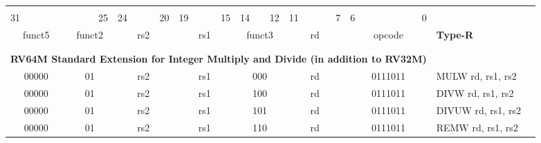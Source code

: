 \documentclass{report}
\begin{document}
\begin{table}[p]
\begin{small}
\begin{center}
\begin{tabular}{p{0.05mm}p{0.05mm}p{0.05mm}p{0.05mm}p{0.05mm}p{0.05mm}p{0.05mm}p{0.05mm}p{0.05mm}p{0.05mm}p{0.05mm}p{0.05mm}p{0.05mm}p{0.05mm}p{0.05mm}p{0.05mm}p{0.05mm}p{0.05mm}p{0.05mm}p{0.05mm}p{0.05mm}p{0.05mm}p{0.05mm}p{0.05mm}p{0.05mm}p{0.05mm}p{0.05mm}p{0.05mm}p{0.05mm}p{0.05mm}p{0.05mm}p{0.05mm}p{50mm}l}& & & & & & & & & & & & & & & & & & & & & & & & & & & & & & & & & \\
\multicolumn{3}{l}{\scriptsize{31}} & \multicolumn{4}{r}{\scriptsize{25}} & \multicolumn{2}{l}{\scriptsize{24}} & \multicolumn{3}{r}{\scriptsize{20}} & \multicolumn{2}{l}{\scriptsize{19}} & \multicolumn{3}{r}{\scriptsize{15}} & \multicolumn{1}{l}{\scriptsize{14}} & \multicolumn{2}{r}{\scriptsize{12}} & \multicolumn{2}{l}{\scriptsize{11}} & \multicolumn{3}{r}{\scriptsize{7}} & \multicolumn{3}{l}{\scriptsize{6}} & \multicolumn{4}{r}{\scriptsize{0}} &  \\
\cline{1-32}
\multicolumn{5}{|c|}{funct5} & \multicolumn{2}{c|}{funct2} & \multicolumn{5}{c|}{rs2} & \multicolumn{5}{c|}{rs1} & \multicolumn{3}{c|}{funct3} & \multicolumn{5}{c|}{rd} & \multicolumn{7}{c|}{opcode} & \scriptsize{\bf Type-R} \\
\cline{1-32}
\tabularnewline
\tabularnewline
\multicolumn{32}{c}{\bf RV64M Standard Extension for Integer Multiply and Divide (in addition to RV32M) } & \\
\cline{1-32}
\multicolumn{5}{|c|}{00000} & \multicolumn{2}{c|}{01} & \multicolumn{5}{c|}{rs2} & \multicolumn{5}{c|}{rs1} & \multicolumn{3}{c|}{000} & \multicolumn{5}{c|}{rd} & \multicolumn{7}{c|}{0111011} & \scriptsize{MULW rd, rs1, rs2} \\
\cline{1-32}
\multicolumn{5}{|c|}{00000} & \multicolumn{2}{c|}{01} & \multicolumn{5}{c|}{rs2} & \multicolumn{5}{c|}{rs1} & \multicolumn{3}{c|}{100} & \multicolumn{5}{c|}{rd} & \multicolumn{7}{c|}{0111011} & \scriptsize{DIVW rd, rs1, rs2} \\
\cline{1-32}
\multicolumn{5}{|c|}{00000} & \multicolumn{2}{c|}{01} & \multicolumn{5}{c|}{rs2} & \multicolumn{5}{c|}{rs1} & \multicolumn{3}{c|}{101} & \multicolumn{5}{c|}{rd} & \multicolumn{7}{c|}{0111011} & \scriptsize{DIVUW rd, rs1, rs2} \\
\cline{1-32}
\multicolumn{5}{|c|}{00000} & \multicolumn{2}{c|}{01} & \multicolumn{5}{c|}{rs2} & \multicolumn{5}{c|}{rs1} & \multicolumn{3}{c|}{110} & \multicolumn{5}{c|}{rd} & \multicolumn{7}{c|}{0111011} & \scriptsize{REMW rd, rs1, rs2} \\

\end{tabular}
\end{center}
\end{small}
\end{table}
\end{document}

